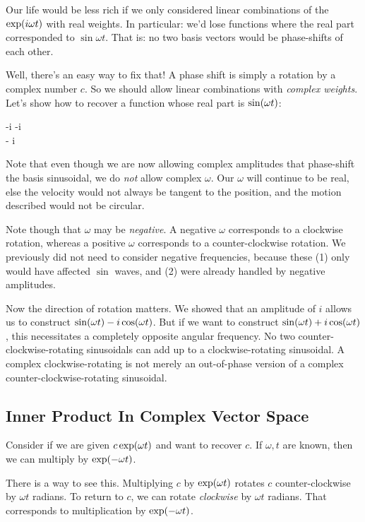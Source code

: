 Our life would be less rich if we only considered linear combinations of
the $\exp\mathopen{}\left( {i \omega t} \right)\mathclose{}$ with real weights. In particular: we'd lose
functions where the real part corresponded to $\sin \omega t$. That is:
no two basis vectors would be phase-shifts of each other.

Well, there's an easy way to fix that! A phase shift is simply a
rotation by a complex number $c$. So we should allow linear combinations
with \emph{complex weights}. Let's show how to recover a function whose
real part is $\sin\mathopen{}\left( {\omega t} \right)\mathclose{}$:

\begin{nedqn}
  -i 
\eqcol
  -i 
\\
\eqcol
   - i 
\end{nedqn}

Note that even though we are now allowing complex amplitudes that
phase-shift the basis sinusoidal, we do \emph{not} allow complex
$\omega$. Our $\omega$ will continue to be real, else the velocity would
not always be tangent to the position, and the motion described would
not be circular.

Note though that $\omega$ may be \emph{negative}. A negative $\omega$
corresponds to a clockwise rotation, whereas a positive $\omega$
corresponds to a counter-clockwise rotation. We previously did not need
to consider negative frequencies, because these (1) only would have
affected $\sin$ waves, and (2) were already handled by negative
amplitudes.

Now the direction of rotation matters. We showed that an amplitude of
$i$ allows us to construct $\sin\mathopen{}\left( {\omega t} \right)\mathclose{} - i \cos\mathopen{}\left( {\omega t} \right)\mathclose{}$. But if
we want to construct $\sin\mathopen{}\left( {\omega t} \right)\mathclose{} + i \cos\mathopen{}\left( {\omega t} \right)\mathclose{}$, this
necessitates a completely opposite angular frequency. No two
counter-clockwise-rotating sinusoidals can add up to a
clockwise-rotating sinusoidal. A complex clockwise-rotating is not
merely an out-of-phase version of a complex counter-clockwise-rotating
sinusoidal.

\subsection{Inner Product In Complex Vector Space}

Consider if we are given $c \exp\mathopen{}\left( {\omega t} \right)\mathclose{}$ and want to recover $c$. If
$\omega, t$ are known, then we can multiply by $\exp\mathopen{}\left( {-\omega t} \right)\mathclose{}$.

There is a way to see this. Multiplying $c$ by $\exp\mathopen{}\left( {\omega t} \right)\mathclose{}$ rotates
$c$ counter-clockwise by $\omega t$ radians. To return to $c$, we can
rotate \emph{clockwise} by $\omega t$ radians. That corresponds to
multiplication by $\exp\mathopen{}\left( {-\omega t} \right)\mathclose{}$.

